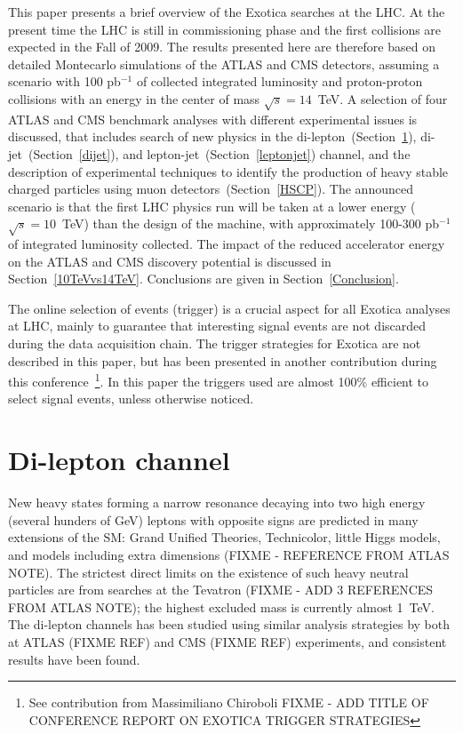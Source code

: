 \documentclass{cimento}
\begin{document}
This paper presents a brief overview of the Exotica searches at the LHC. 
At the present time the LHC is still in commissioning phase 
and the first collisions are expected in the Fall of 2009.
The results presented here are therefore based on detailed 
Montecarlo simulations of the ATLAS and CMS detectors, 
assuming a scenario with 100 pb$^{-1}$ of collected integrated luminosity 
and proton-proton collisions with an energy in the center of mass $\sqrt{s} = 14$~TeV. 
A selection of four ATLAS and CMS benchmark analyses with different 
experimental issues is discussed, that includes 
search of new physics in the di-lepton~(Section~\ref{dilepton}), 
di-jet~(Section~\ref{dijet}), and lepton-jet~(Section~\ref{leptonjet}) channel, 
and the description of experimental techniques to identify the production of 
heavy stable charged particles using muon detectors~(Section~\ref{HSCP}).
The announced scenario is that the first LHC physics run 
will be taken at a lower energy ($\sqrt{s} = 10$~TeV) 
than the design of the machine, with approximately 
100-300 pb$^{-1}$ of integrated luminosity collected. 
The impact of the reduced accelerator energy on the ATLAS and CMS 
discovery potential is discussed in Section~\ref{10TeVvs14TeV}. 
Conclusions are given in Section~\ref{Conclusion}.

The online selection of events (trigger) is a 
crucial aspect for all Exotica analyses at LHC, mainly to guarantee that 
interesting signal events are not discarded during the data acquisition chain. 
The trigger strategies for Exotica are not described in this paper, but 
has been presented in another contribution during this 
conference~\footnote{See contribution from Massimiliano Chiroboli 
FIXME - ADD TITLE OF CONFERENCE REPORT ON EXOTICA TRIGGER STRATEGIES}. 
In this paper the triggers used are almost 100\% efficient 
to select signal events, unless otherwise noticed.

\section{Di-lepton channel} \label{dilepton}

New heavy states forming a narrow resonance decaying 
into two high energy (several hunders of GeV) 
leptons with opposite signs are predicted in  
many extensions of the SM: Grand Unified Theories, 
Technicolor, little Higgs models, and models 
including extra dimensions (FIXME - REFERENCE FROM ATLAS NOTE). 
The strictest direct limits on the existence of such 
heavy neutral particles are from searches 
at the Tevatron (FIXME - ADD 3 REFERENCES FROM ATLAS NOTE); 
the highest excluded mass is currently almost 1~TeV.
The di-lepton channels has been studied using similar 
analysis strategies by both at ATLAS (FIXME REF) and CMS (FIXME REF)
experiments, and consistent results have been found. 
\end{document}
